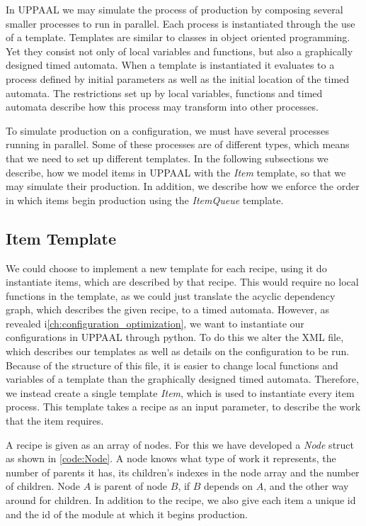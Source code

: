 In UPPAAL we may simulate the process of production by composing several smaller processes to run in parallel. Each process is instantiated through the use of a template. Templates are similar to classes in object oriented programming. Yet they consist not only of local variables and functions, but also a graphically designed timed automata. When a template is instantiated it evaluates to a process defined by initial parameters as well as the initial location of the timed automata. The restrictions set up by local variables, functions and timed automata  describe how this process may transform into other processes.   

To simulate production on a configuration, we must have several processes running in parallel. Some of these processes are of different types, which means that we need to set up different templates. In the following subsections we describe, how we model items in UPPAAL with the \textit{Item} template, so that we may simulate their production. In addition, we describe how we enforce the order in which items begin production using the \textit{ItemQueue} template.

\subsection{Item Template}\label{subs:recipe}
We could choose to implement a new template for each recipe, using it do instantiate items, which are described by that recipe. This would require no local functions in the template, as we could just translate the acyclic dependency graph, which describes the given recipe, to a timed automata. However, as revealed i\cref{ch:configuration_optimization}, we want to  instantiate our configurations in UPPAAL through python. To do this we alter the XML file, which describes our templates as well as details on the configuration to be run. Because of the structure of this file, it is easier to change local functions and variables of a template than the graphically designed timed automata. Therefore, we instead create a single template \textit{Item}, which is used to instantiate every item process. This template takes a recipe as an input parameter, to describe the work that the item requires.

A recipe is given as an array of nodes. For this we have developed a \textit{Node} struct as shown in \cref{code:Node}. A node knows what type of work it represents, the number of parents it has, its children's indexes in the node array and the number of children. Node $A$ is parent of node $B$, if $B$ depends on $A$, and the other way around for children. In addition to the recipe, we also give each item a unique id and the id of the module at which it begins production. 

